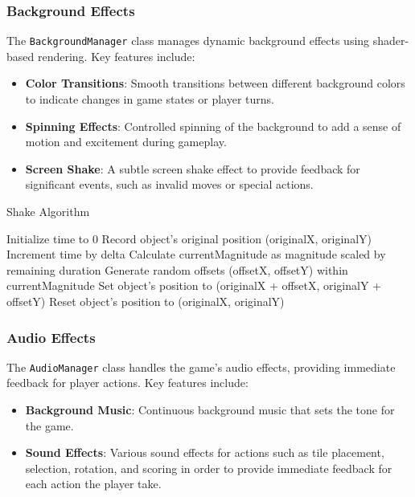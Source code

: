 \documentclass[conference]{IEEEtran}
\begin{document}
\subsubsection{Background Effects}
The \texttt{BackgroundManager} class manages dynamic background effects using shader-based rendering. Key features include:
\begin{itemize}
    \item \textbf{Color Transitions}: Smooth transitions between different background colors to indicate changes in game states or player turns.
    \item \textbf{Spinning Effects}: Controlled spinning of the background to add a sense of motion and excitement during gameplay.
    \item \textbf{Screen Shake}: A subtle screen shake effect to provide feedback for significant events, such as invalid moves or special actions.
\end{itemize}

\begin{algorithm}
    \caption{Shake Algorithm}
    \begin{algorithmic}
        \State Initialize time to 0
        \State Record object's original position (originalX, originalY)
            \State Increment time by delta
            \State Calculate currentMagnitude as magnitude scaled by remaining duration
            \State Generate random offsets (offsetX, offsetY) within currentMagnitude
            \State Set object's position to (originalX + offsetX, originalY + offsetY)
        \EndWhile
        \State Reset object's position to (originalX, originalY)
    \end{algorithmic}
\end{algorithm}

\subsubsection{Audio Effects}
The \texttt{AudioManager} class handles the game's audio effects, providing
immediate feedback for player actions. Key features include:
\begin{itemize}
    \item \textbf{Background Music}: Continuous background music that sets the tone for the game.
    \item \textbf{Sound Effects}: Various sound effects for actions such as tile placement, selection, rotation, and scoring in order to provide immediate feedback for each action the player take.
\end{itemize}
\end{document}
